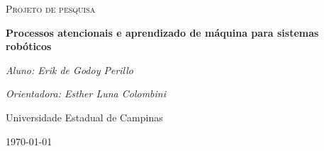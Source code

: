 \documentclass[8pt]{article}
\begin{document}
\begin{titlepage}
	\centering
	{\scshape\Large Projeto de pesquisa\par}
	\vspace{1.5cm}
	{\huge\bfseries Processos atencionais e aprendizado de máquina 
		para sistemas robóticos\par}
	\vspace{1cm}
	{\itshape Aluno: Erik de Godoy Perillo\par}
	{\itshape Orientadora: Esther Luna Colombini\par}
	\vspace{0.5cm}
	\begin{abstract}
		Entender o ambiente ao seu redor é uma tarefa fundamental para 
		o desafio de se obter máquinas autônomas que interagem com o 
		ambiente de forma semelhante à nossa.
		A alta dimensionalidade dos dados captados por sensores usados para 
		este fim é em geral problemática pois muitas vezes há
		redundância e irrelevância de informação. 
		Neste projeto, propomos o uso de processos atencionais em cascata 
		com aprendizado de máquina a fim de se obter um sistema de 
		identificação de classificação de objetos em um dado ambiente
		que seja eficiente, preciso e geral. 
		Por fim, planeja-se implementar uma estrutura que permita o uso das
		técnicas por projetos robóticos em geral em GPUs embarcadas.
	\end{abstract}
	\vfill
	Universidade Estadual de Campinas 
	\vfill
	{\large \today\par}
\end{titlepage}

\newpage
\end{document}
